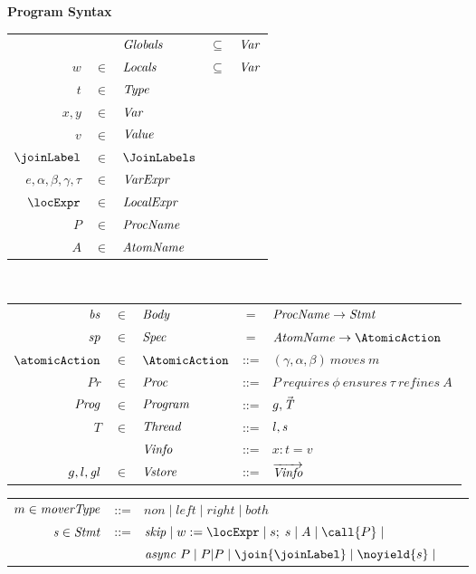 

\begin{figure}
\setlength{\tabcolsep}{3pt}
{\bf Program Syntax} \\
\begin{tabular}{rclcl}
& & $\mathit{Globals}$ & $\subseteq$ &$\mathit{Var}$ \\
$w$ & $\in$ & $\mathit{Locals}$ & $\subseteq$ & $\mathit{Var}$ \\
$t$ & $\in$ & $\mathit{Type}$ \\
$x,y$ & $\in$ & $\mathit{Var}$ \\
$v$ &  $\in$ & $\mathit{Value}$ \\
$\joinLabel$ & $\in$ & $\JoinLabels$ \\
$e,\alpha,\beta,\gamma,\tau$ & $\in$ & $\mathit{VarExpr}$ \\
$\locExpr$ & $\in$ & $\mathit{LocalExpr}$ \\
$P$ & $\in$ & $\mathit{ProcName}$ \\
$A$ & $\in$ & $\mathit{AtomName}$ \\
\end{tabular}\\
\begin{tabular}{rclcl}
$\mathit{bs}$ & $\in$ & $\mathit{Body}$ & = & $\mathit{ProcName} \rightarrow \mathit{Stmt}$ \\
$\mathit{sp}$ & $\in$ & $\mathit{Spec}$ & = & $\AtomName \rightarrow \AtomicAction$ \\
$\atomicAction$ & $\in$ & $\AtomicAction$ & ::= & $(\gamma,\alpha,\beta)\ \mathit{moves}\ m$ \\
$Pr$ & $\in$ & $\mathit{Proc}$ &::= & $P\ \mathit{requires}\ \phi\
\mathit{ensures}\ \tau\ \mathit{refines}\ A\ $ \\
$\mathit{Prog}$ & $\in$ & $\mathit{Program}$ & ::= & $g, \vec{\mathit{T}}$ \\
$T$ & $\in$ & $\mathit{Thread}$ & ::=  & $l, \mathit{s}$ \\
&&$\mathit{Vinfo}$ & ::= & $x:t=v$ \\
$g,l,\mathit{gl}$ & $\in$ & $\mathit{Vstore}$ & ::= & $\overrightarrow{\mathit{Vinfo}}$ \\
\end{tabular}
\begin{tabular}{rclcl}
$m \in \mathit{moverType}$ &::= &$\mathit{non} \mid \mathit{left} \mid \mathit{right} \mid \mathit{both}$ \\
$\mathit{s} \in \mathit{Stmt}$ &::= & $\skipstmt \mid w := \locExpr \mid s;\;s \mid A \mid \call{P} \mid $ \\
                  & & $\async{P} \mid \parcall{P}{P} \mid \join{\joinLabel} \mid \noyield{s} \mid$\\

\end{tabular}
\end{figure}
